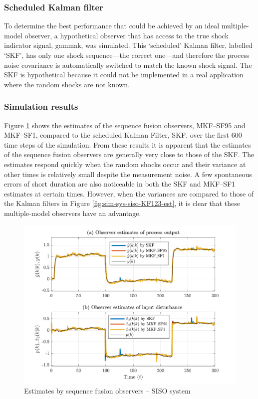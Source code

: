 \subsubsection{Scheduled Kalman filter} \label{sim-obs-lin-1-SKF}

To determine the best performance that could be achieved by an ideal multiple-model observer, a hypothetical observer that has access to the true shock indicator signal, \gls{gammak}, was simulated. This `scheduled' Kalman filter, labelled ‘SKF’, has only one shock sequence---the correct one---and therefore the process noise covariance is automatically switched to match the known shock signal. The SKF is hypothetical because it could not be implemented in a real application where the random shocks are not known.

\subsubsection{Simulation results} \label{sim-obs-lin-1-results}

Figure \ref{fig:rod-obs-sim1-yest-1-SF} shows the estimates of the sequence fusion observers, MKF--SF95 and MKF--SF1, compared to the scheduled Kalman Filter, SKF, over the first 600 time steps of the simulation. From these results it is apparent that the estimates of the sequence fusion observers are generally very close to those of the SKF. The estimates respond quickly when the random shocks occur and their variance at other times is relatively small despite the measurement noise. A few spontaneous errors of short duration are also noticeable in both the SKF and MKF--SF1 estimates at certain times. However, when the variances are compared to those of the Kalman filters in Figure \ref{fig:sim-sys-siso-KF123-est}, it is clear that these multiple-model observers have an advantage.
\begin{figure}[htp]
	\centering
	\includegraphics[width=13cm]{images/rod_obs_sim1_all_seed_y_est1_SF95_SF1.pdf}
	\caption{Estimates by sequence fusion observers – SISO system}
	\label{fig:rod-obs-sim1-yest-1-SF}
\end{figure}

